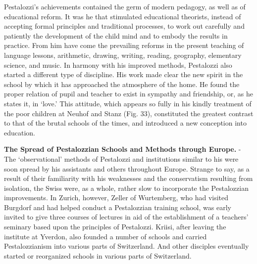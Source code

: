 \documentclass[]{book}
\begin{document}
Pestalozzi's achievements contained the germ of modern pedagogy, as well as of educational reform. It was he that stimulated educational theorists, instead of accepting formal principles and traditional processes, to work out carefully and patiently the development of the child mind and to embody the results in practice. From him have come the prevailing reforms in the present teaching of language lessons, arithmetic, drawing, writing, reading, geography, elementary science, and music. In harmony with his improved methods, Pestalozzi also started a different type of discipline. His work made clear the new spirit in the school by which it has approached the atmosphere of the home. He found the proper relation of pupil and teacher to exist in sympathy and friendship, or, as he states it, in `love.' This attitude, which appears so fully in his kindly treatment of the poor children at Neuhof and Stanz (Fig. 33), constituted the greatest contrast to that of the brutal schools of the times, and introduced a new conception into education.

\textbf{The Spread of Pestalozzian Schools and Methods through Europe.} - The `observational' methods of Pestalozzi and institutions similar to his were soon spread by his assistants and others throughout Europe. Strange to say, as a result of their familiarity with his weaknesses and the conservatism resulting from isolation, the Swiss were, as a whole, rather slow to incorporate the Pestalozzian improvements. In Zurich, however, Zeller of Wurtemberg, who had visited Burgdorf and had helped conduct a Pestalozzian training school, was early invited to give three courses of lectures in aid of the establishment of a teachers' seminary based upon the principles of Pestalozzi. Kriisi, after leaving the institute at Yverdon, also founded a number of schools and carried Pestalozzianism into various parts of Switzerland. And other disciples eventually started or reorganized schools in various parts of Switzerland.
\end{document}
